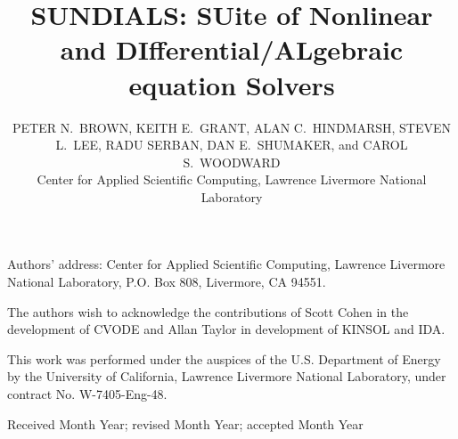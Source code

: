 \documentclass[acmtoms]{acmtrans2m}
\title{SUNDIALS: SUite of Nonlinear and DIfferential/ALgebraic equation Solvers}
\author{PETER N.~BROWN, KEITH E.~GRANT, ALAN C.~HINDMARSH, 
  STEVEN L.~LEE, RADU SERBAN, DAN E.~SHUMAKER, and CAROL S.~WOODWARD \\
  Center for Applied Scientific Computing,
  Lawrence Livermore National Laboratory}
\begin{document}
\setcounter{page}{1}

\begin{bottomstuff}
Authors' address: Center for Applied Scientific Computing, 
Lawrence Livermore National Laboratory, P.O. Box 808,
Livermore, CA 94551.
\end{bottomstuff}

\maketitle




   
   
   








\begin{acks}
The authors wish to acknowledge the contributions of Scott Cohen
in the development of CVODE and Allan Taylor in development of
KINSOL and IDA.  

This work was performed under the auspices of the
U.S. Department of Energy by the University of California,
Lawrence Livermore National Laboratory, under contract No.
W-7405-Eng-48.
\end{acks}





\begin{received}
Received Month Year;
revised Month Year; accepted Month Year
\end{received}
\end{document}
